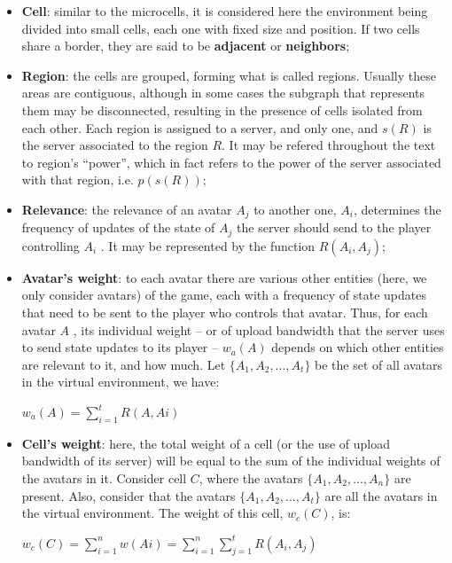 \begin{itemize}
	\item \textbf{Cell}: similar to the microcells, it is considered here the environment being divided into small cells, each one with fixed size and position. If two cells share a border, they are said to be \textbf{adjacent} or \textbf{neighbors};
	\item \textbf{Region}: the cells are grouped, forming what is called regions. Usually these areas are contiguous, although in some cases the subgraph that represents them may be disconnected, resulting in the presence of cells isolated from each other. Each region is assigned to a server, and only one, and $s(R)$ is the server associated to the region $R$. It may be refered throughout the text to region's ``power'', which in fact refers to the power of the server associated with that region, i.e. $p(s(R))$;
	\item \textbf{Relevance}: the relevance of an avatar $A_j$ to another one, $A_i$, determines the frequency of updates of the state of $A_j$ the server should send to the player controlling $A_i$ \cite{bezerra2008a3}. It may be represented by the function $R(A_i,A_j)$;
	\item \textbf{Avatar's weight}: to each avatar there are various other entities (here, we only consider avatars) of the game, each with a frequency of state updates that need to be sent to the player who controls that avatar. Thus, for each avatar $A$ , its individual weight -- or of upload bandwidth that the server uses to send state updates to its player -- $w_a(A)$ depends on which other entities are relevant to it, and how much. 
	Let $\{A_1, A_2, ..., A_t\}$ be the set of all avatars in the virtual environment, we have:
	
		\begin{center}
			$\displaystyle w_a(A) = \sum_{i=1}^{t} R(A,Ai)$
		\end{center}
				
	\item \textbf{Cell's weight}: here, the total weight of a cell (or the use of upload bandwidth of its server) will be equal to the sum of the individual weights of the avatars in it. Consider cell $C$, where the avatars $\{A_1, A_2, ..., A_n\}$ are present. Also, consider that the avatars $\{A_1, A_2, ..., A_t\}$ are all the avatars in the virtual environment. The weight of this cell, $w_c(C)$, is:
	
		\begin{center}		
			$\displaystyle w_c(C) = \sum_{i=1}^{n} w(Ai) = \sum_{i=1}^{n} \sum_{j=1}^{t} R(A_i,A_j)$
		\end{center}
		

\end{itemize}
